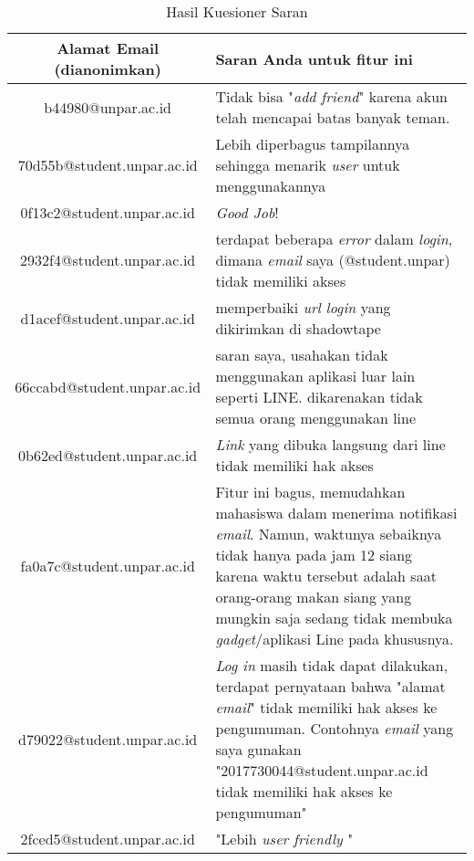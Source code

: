 \begin{longtable}{|c|p{7cm}|}
	\caption{Hasil Kuesioner Saran} 
	\label{table:hasil-kuesioner-saran} \\
\hline
\hline	\textbf{Alamat Email (dianonimkan)}	&	\centerline{\textbf{Saran Anda untuk fitur ini}}	\\
\hline	b44980@unpar.ac.id	&	Tidak bisa "\textit{add friend}" karena akun telah mencapai batas banyak teman.	\\
\hline	70d55b@student.unpar.ac.id	&	Lebih diperbagus tampilannya sehingga menarik \textit{user} untuk menggunakannya	\\
\hline	0f13c2@student.unpar.ac.id	&	\textit{Good Job}!	\\
\hline	2932f4@student.unpar.ac.id	&	terdapat beberapa \textit{error} dalam \textit{login}, dimana \textit{email} saya (@student.unpar) tidak memiliki akses	\\
\hline	d1acef@student.unpar.ac.id	&	memperbaiki \textit{url login} yang dikirimkan di shadowtape	\\
\hline	66ccabd@student.unpar.ac.id	&	saran saya, usahakan tidak menggunakan aplikasi luar lain seperti LINE. dikarenakan tidak semua orang menggunakan line	\\
\hline	0b62ed@student.unpar.ac.id	&	\textit{Link} yang dibuka langsung dari line tidak memiliki hak akses	\\
\hline	fa0a7c@student.unpar.ac.id	&	Fitur ini bagus, memudahkan mahasiswa dalam menerima notifikasi \textit{email}. Namun, waktunya sebaiknya tidak hanya pada jam 12 siang karena waktu tersebut adalah saat orang-orang makan siang yang mungkin saja sedang tidak membuka \textit{gadget}/aplikasi Line pada khususnya.	\\
\hline	d79022@student.unpar.ac.id	&	\textit{Log in} masih tidak dapat dilakukan, terdapat pernyataan bahwa "alamat \textit{email}" tidak memiliki hak akses ke pengumuman. Contohnya \textit{email} yang saya gunakan "2017730044@student.unpar.ac.id tidak memiliki hak akses ke pengumuman"	\\
\hline	2fced5@student.unpar.ac.id	&	"Lebih \textit{user friendly}
"	\\
\hline
\end{longtable}